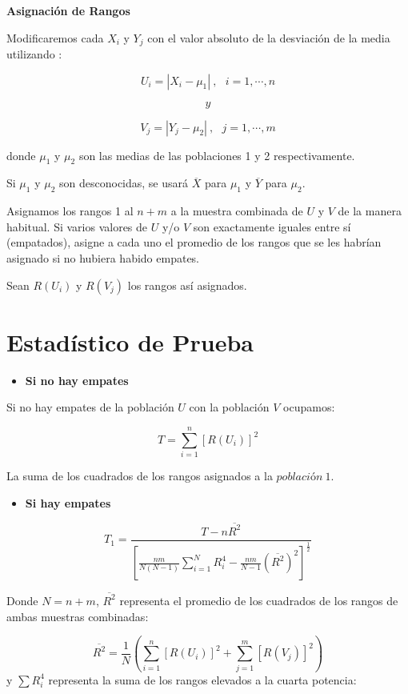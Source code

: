 \documentclass[
  a4paper,
  oneside,
  openany]{book}
\providecommand{\tightlist}{%
  \setlength{\itemsep}{0pt}\setlength{\parskip}{0pt}}
\begin{document}
\textbf{Asignación de Rangos}

Modificaremos cada \(X_{i}\) y \(Y_{j}\) con el valor absoluto de la desviación de la media utilizando :

\[U_{i} = |X_{i}-\mu_{1}| \ , \ \ \ i=1,\cdots,n\]

\[y\]

\[V_{j} = |Y_{j}-\mu_{2}|\  ,\ \ \ j=1,\cdots,m\]

donde \(\mu_{1}\) y \(\mu_{2}\) son las medias de las poblaciones 1 y 2 respectivamente.

Si \(\mu_{1}\) y \(\mu_{2}\) son desconocidas, se usará \(\overline{X}\) para \(\mu_{1}\) y \(\overline{Y}\) para \(\mu_{2}\).

Asignamos los rangos 1 al \(n + m\) a la muestra combinada de \(U\) y \(V\) de la manera habitual.
Si varios valores de \(U\) y/o \(V\) son exactamente iguales entre sí (empatados), asigne a cada uno el promedio de los rangos que se les habrían asignado si no hubiera habido empates.

Sean \(R(U_{i})\) y \(R(V_{j})\) los rangos así asignados.

\hypertarget{estaduxedstico-de-prueba-7}{%
\section{Estadístico de Prueba}\label{estaduxedstico-de-prueba-7}}

\begin{itemize}
\tightlist
\item
  \textbf{Si no hay empates}
\end{itemize}

Si no hay empates de la población \(U\) con la población \(V\) ocupamos:

\[T=\sum_{i=1}^{n}[R(U_{i})]^2\]

La suma de los cuadrados de los rangos asignados a la \(población \ 1\).

\begin{itemize}
\tightlist
\item
  \textbf{Si hay empates}
\end{itemize}

\[T_{1} = \frac{T-n\overline{R^2}}{\left[\frac{nm}{N(N-1)}\sum_{i=1}^{N}R_{i}^4-\frac{nm}{N-1}(\overline{R^2})^2\right]^\frac{1}{2}}\]

Donde \(N= n+m\), \(\overline{R^2}\) representa el promedio de los cuadrados de los rangos de ambas muestras combinadas:

\[\overline{R^2}= \frac{1}{N}\left(\sum_{i=1}^{n}[R(U_{i})]^2+\sum_{j=1}^{m}[R(V_{j})]^2\right)\]
y \(\sum R_{i}^4\) representa la suma de los rangos elevados a la cuarta potencia:
\end{document}
